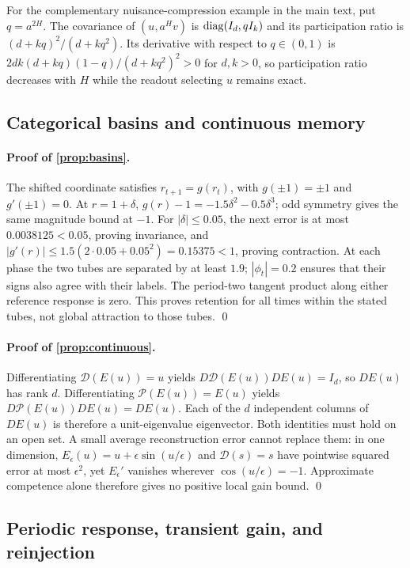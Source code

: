 For the complementary nuisance-compression example in the main text, put
$q=a^{2H}$. The covariance of $(u,a^Hv)$ is
$\operatorname{diag}(I_d,qI_k)$ and its participation ratio is
$(d+kq)^2/(d+kq^2)$. Its derivative with respect to $q\in(0,1)$ is
$2dk(d+kq)(1-q)/(d+kq^2)^2>0$ for $d,k>0$, so participation ratio decreases
with $H$ while the readout selecting $u$ remains exact.

\subsection{Categorical basins and continuous memory}

\paragraph{Proof of \cref{prop:basins}.}
The shifted coordinate satisfies $r_{t+1}=g(r_t)$, with
$g(\pm1)=\pm1$ and $g'(\pm1)=0$. At $r=1+\delta$,
$g(r)-1=-1.5\delta^2-0.5\delta^3$; odd symmetry gives the same magnitude
bound at $-1$. For $|\delta|\le0.05$, the next error is at most
$0.0038125<0.05$, proving invariance, and
$|g'(r)|\le1.5(2\cdot0.05+0.05^2)=0.15375<1$, proving contraction.
At each phase the two tubes are separated by at least $1.9$;
$|\phi_t|=0.2$ ensures that their signs also agree with their labels.
The period-two tangent product along either reference response is zero.
This proves retention for all times within the stated tubes, not global
attraction to those tubes. \qed

\paragraph{Proof of \cref{prop:continuous}.}
Differentiating $\mathcal D(E(u))=u$ yields
$D\mathcal D(E(u))DE(u)=I_d$, so $DE(u)$ has rank $d$.
Differentiating $\mathcal P(E(u))=E(u)$ yields
$D\mathcal P(E(u))DE(u)=DE(u)$. Each of the $d$ independent columns of
$DE(u)$ is therefore a unit-eigenvalue eigenvector. Both identities must hold
on an open set. A small average reconstruction error cannot replace them:
in one dimension, $E_\epsilon(u)=u+\epsilon\sin(u/\epsilon)$ and
$\mathcal D(s)=s$ have pointwise squared error at most $\epsilon^2$,
yet $E_\epsilon'$ vanishes wherever $\cos(u/\epsilon)=-1$.
Approximate competence alone therefore gives no positive local gain bound. \qed

\subsection{Periodic response, transient gain, and reinjection}

